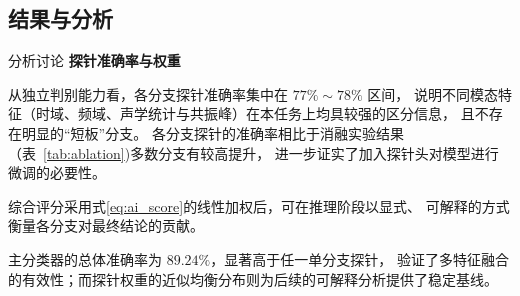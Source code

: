 \documentclass[aspectratio=169]{beamer}
\providecommand{\paragraph}[1]{\smallskip\textbf{#1}\par}
\begin{document}
\subsection{结果与分析}
\begin{frame}{分析讨论}
\paragraph{探针准确率与权重} 

从独立判别能力看，各分支探针准确率集中在 $77\%\sim78\%$ 区间，
说明不同模态特征（时域、频域、声学统计与共振峰）在本任务上均具较强的区分信息，
且不存在明显的“短板”分支。
各分支探针的准确率相比于消融实验结果（表~\ref{tab:ablation})多数分支有较高提升，
进一步证实了加入探针头对模型进行微调的必要性。

综合评分采用式\ref{eq:ai_score}的线性加权后，可在推理阶段以显式、
可解释的方式衡量各分支对最终结论的贡献。

主分类器的总体准确率为 $89.24\%$，显著高于任一单分支探针，
验证了多特征融合的有效性；而探针权重的近似均衡分布则为后续的可解释分析提供了稳定基线。
\end{frame}
\end{document}
